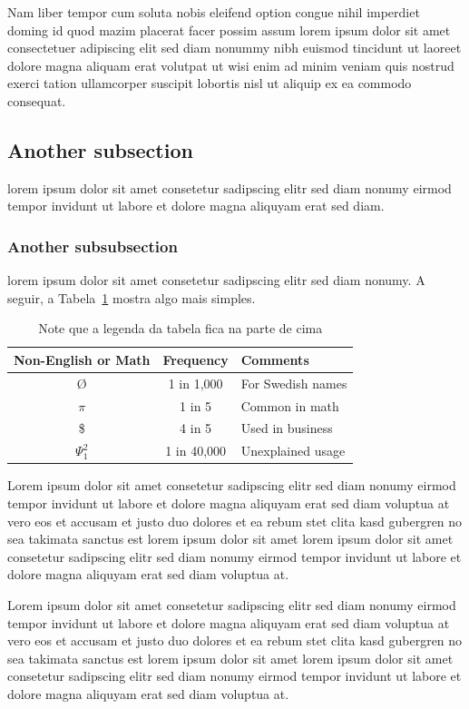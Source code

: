 \documentclass[sigconf]{acmart}
\begin{document}
Nam liber tempor cum soluta nobis eleifend option congue nihil
imperdiet doming id quod mazim placerat facer possim assum lorem
ipsum dolor sit amet consectetuer adipiscing elit sed diam nonummy
nibh euismod tincidunt ut laoreet dolore magna aliquam erat
volutpat ut wisi enim ad minim veniam quis nostrud exerci tation
ullamcorper suscipit lobortis nisl ut aliquip ex ea commodo
consequat.

\subsection{Another subsection}

lorem ipsum dolor sit amet consetetur sadipscing elitr sed diam
nonumy eirmod tempor invidunt ut labore et dolore magna aliquyam
erat sed diam.~\cite{COFFMANPACKING98}

\subsubsection{Another subsubsection}

lorem ipsum dolor sit amet consetetur sadipscing elitr sed diam
nonumy. A seguir, a Tabela~\ref{tab:tab2} mostra algo mais
simples.

\begin{table}
  \caption{Note que a legenda da tabela fica na parte de cima}
  \label{tab:tab2}
  \begin{tabular}{ccl}
    \toprule
    Non-English or Math&Frequency&Comments\\
    \midrule
    \O & 1 in 1,000& For Swedish names\\
    $\pi$ & 1 in 5& Common in math\\
    \$ & 4 in 5 & Used in business\\
    $\Psi^2_1$ & 1 in 40,000& Unexplained usage\\
  \bottomrule
\end{tabular}
\end{table}

Lorem ipsum dolor sit amet consetetur sadipscing elitr sed diam
nonumy eirmod tempor invidunt ut labore et dolore magna aliquyam
erat sed diam voluptua at vero eos et accusam et justo duo dolores
et ea rebum stet clita kasd gubergren no sea takimata sanctus est
lorem ipsum dolor sit amet lorem ipsum dolor sit amet consetetur
sadipscing elitr sed diam nonumy eirmod tempor invidunt ut labore
et dolore magna aliquyam erat sed diam voluptua at.

Lorem ipsum dolor sit amet consetetur sadipscing elitr sed diam
nonumy eirmod tempor invidunt ut labore et dolore magna aliquyam
erat sed diam voluptua at vero eos et accusam et justo duo dolores
et ea rebum stet clita kasd gubergren no sea takimata sanctus est
lorem ipsum dolor sit amet lorem ipsum dolor sit amet consetetur
sadipscing elitr sed diam nonumy eirmod tempor invidunt ut labore
et dolore magna aliquyam erat sed diam voluptua at.
\end{document}

